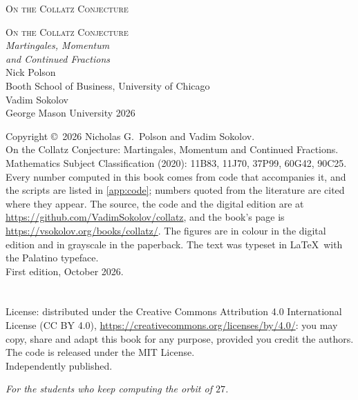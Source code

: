 \thispagestyle{empty}
\begin{center}
\vspace*{2.2in}
{\Huge\scshape On the Collatz Conjecture}
\end{center}
\cleardoublepage

\thispagestyle{empty}
\begin{center}
\vspace*{1.1in}
{\huge\scshape On the Collatz Conjecture}\\[16pt]
{\Large\itshape Martingales, Momentum\\[4pt] and Continued Fractions}\\[1.2in]
{\Large Nick Polson}\\[4pt]
{\small Booth School of Business, University of Chicago}\\[22pt]
{\Large Vadim Sokolov}\\[4pt]
{\small George Mason University}
\vfill
{\small 2026}
\end{center}
\clearpage

\thispagestyle{empty}
\vspace*{\fill}
{\small\noindent
Copyright \copyright\ 2026 Nicholas G.\ Polson and Vadim Sokolov.\\[8pt]
On the Collatz Conjecture: Martingales, Momentum and Continued Fractions.\\[8pt]
Mathematics Subject Classification (2020): 11B83, 11J70, 37P99, 60G42, 90C25.\\[8pt]
Every number computed in this book comes from code that accompanies it, and the scripts are listed in \cref{app:code}; numbers quoted from the literature are cited where they appear.
The source, the code and the digital edition are at \url{https://github.com/VadimSokolov/collatz}, and the book's page is \url{https://vsokolov.org/books/collatz/}.
The figures are in colour in the digital edition and in grayscale in the paperback.
The text was typeset in \LaTeX\ with
the Palatino typeface.\\[8pt]
First edition, October 2026.%
\ifx\BookISBNline\empty\else\\[8pt]\BookISBNline\fi
\ifx\BookDOIline\empty\else\\[8pt]\BookDOIline\fi
\\[8pt]License: distributed under the Creative Commons Attribution 4.0 International License (CC BY 4.0), \url{https://creativecommons.org/licenses/by/4.0/}: you may copy, share and adapt this book for any purpose, provided you credit the authors. The code is released under the MIT License.\\[8pt]
Independently published.\par}
\cleardoublepage

\thispagestyle{empty}
\vspace*{2in}
\begin{center}
\itshape
For the students who keep computing the orbit of $27$.
\end{center}
\cleardoublepage
